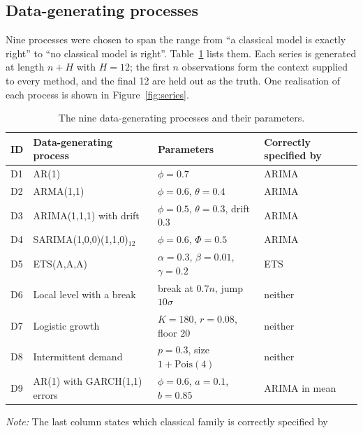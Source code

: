 \documentclass[ASNA]{USG}
\providecommand{\tableref}[1]{Table~\ref{#1}}
\providecommand{\figureref}[1]{Figure~\ref{#1}}
\begin{document}
\subsection{Data-generating processes}
\label{sec:dgps}

Nine processes were chosen to span the range from ``a classical model is exactly right'' to
``no classical model is right''. \tableref{tab:dgps} lists them. Each series is generated at
length $n + H$ with $H = 12$; the first $n$ observations form the context supplied to every
method, and the final 12 are held out as the truth. One realisation of each process is shown
in \figureref{fig:series}.

\begin{table}[!htbp]
\centering
\begin{threeparttable}
\caption{The nine data-generating processes and their parameters.}
\label{tab:dgps}
\small\setlength{\tabcolsep}{4pt}
\begin{tabular}{llll}
\toprule
ID & Data-generating process & Parameters & Correctly specified by \\
\midrule
D1 & AR(1)                        & $\phi = 0.7$                                & ARIMA \\
D2 & ARMA(1,1)                    & $\phi = 0.6$, $\theta = 0.4$                & ARIMA \\
D3 & ARIMA(1,1,1) with drift      & $\phi = 0.5$, $\theta = 0.3$, drift $0.3$   & ARIMA \\
D4 & SARIMA(1,0,0)(1,1,0)$_{12}$  & $\phi = 0.6$, $\Phi = 0.5$                  & ARIMA \\
D5 & ETS(A,A,A)                   & $\alpha = 0.3$, $\beta = 0.01$, $\gamma = 0.2$ & ETS \\
D6 & Local level with a break     & break at $0.7n$, jump $10\sigma$            & neither \\
D7 & Logistic growth              & $K = 180$, $r = 0.08$, floor $20$           & neither \\
D8 & Intermittent demand          & $p = 0.3$, size $1 + \mathrm{Pois}(4)$      & neither \\
D9 & AR(1) with GARCH(1,1) errors & $\phi = 0.6$, $a = 0.1$, $b = 0.85$         & ARIMA in mean \\
\bottomrule
\end{tabular}
\begin{tablenotes}[flushleft]\footnotesize
\item \textit{Note:} The last column states which classical family is correctly specified by

\end{tablenotes}
\end{threeparttable}
\end{table}
\end{document}
